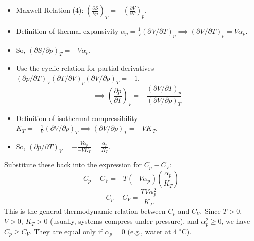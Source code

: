 \documentclass[11pt]{article}
\newcommand{\pderiv}[2]{\frac{\partial #1}{\partial #2}}
\begin{document}
\begin{itemize}
    \item Maxwell Relation (4): $\left(\pderiv{S}{p}\right)_T = -\left(\pderiv{V}{T}\right)_p$.
    \item Definition of thermal expansivity $\alpha_p = \frac{1}{V} (\partial V / \partial T)_p \implies (\partial V / \partial T)_p = V \alpha_p$.
    \item So, $(\partial S / \partial p)_T = - V \alpha_p$.

    \item Use the cyclic relation for partial derivatives $(\partial p / \partial T)_V (\partial T / \partial V)_p (\partial V / \partial p)_T = -1$.
    \[ \implies \left(\pderiv{p}{T}\right)_V = - \frac{(\partial V / \partial T)_p}{(\partial V / \partial p)_T} \]
    \item Definition of isothermal compressibility $K_T = -\frac{1}{V} (\partial V / \partial p)_T \implies (\partial V / \partial p)_T = -V K_T$.
    \item So, $(\partial p / \partial T)_V = - \frac{V \alpha_p}{-V K_T} = \frac{\alpha_p}{K_T}$.
\end{itemize}
Substitute these back into the expression for $C_p - C_V$:
\[ C_p - C_V = -T (-V \alpha_p) \left( \frac{\alpha_p}{K_T} \right) \]
\[ C_p - C_V = \frac{T V \alpha_p^2}{K_T} \]
This is the general thermodynamic relation between $C_p$ and $C_V$.
Since $T>0$, $V>0$, $K_T>0$ (usually, systems compress under pressure), and $\alpha_p^2 \ge 0$, we have $C_p \ge C_V$. They are equal only if $\alpha_p=0$ (e.g., water at 4 $^\circ$C).
\end{document}

